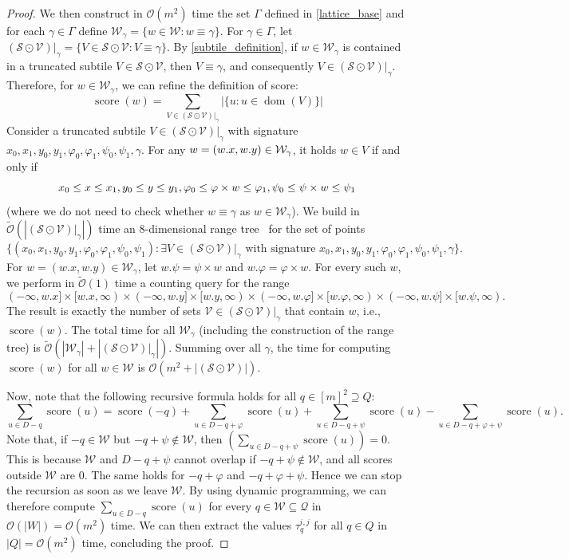 \documentclass[a4paper,11pt]{article}
\let\Cref\cref
\renewcommand{\O}{\mathcal{O}}
\newcommand{\tO}{\tilde{\mathcal{O}}}
\newcommand{\Q}{\mathcal{Q}}
\renewcommand{\S}{\mathcal{S}}
\newcommand{\V}{\mathcal{V}}
\newcommand{\W}{\mathcal{W}}
\renewcommand{\phi}{\varphi}
\DeclareMathOperator*{\score}{score}
\DeclareMathOperator*{\dom}{dom}
\newcommand{\absolute}[1]{\left\lvert#1\right\rvert}
\begin{document}
\begin{proof}
We then construct in $\O(m^2)$ time the set $\Gamma$ defined in \Cref{lattice_base} and for each $\gamma \in \Gamma$ define $\W_\gamma = \{w \in \W : w \equiv \gamma\}$. For $\gamma \in \Gamma$, let $(\S \odot \V) |_\gamma = \{V \in \S \odot \V : V \equiv \gamma\}$. 
By \cref{subtile_definition}, if $w \in \W_\gamma$ is contained in a truncated subtile $V \in \S \odot \V$, then $V \equiv \gamma$, and consequently $V \in (\S \odot \V) |_\gamma$. Therefore, for $w \in \W_\gamma$, we can refine the definition of score:
%
$$\score(w) = \sum_{V \in (\S \odot \V) |_\gamma} \absolute{\{u : u \in \dom(V)\}}$$
%
Consider a truncated subtile $V \in (\S \odot \V) |_\gamma$ with signature $x_0, x_1, y_0, y_1, \phi_0, \phi_1, \psi_0, \psi_1, \gamma$. For any $w = (\x{w}, \y{w}) \in \W_\gamma$, it holds $w \in V$ if and only if
\begin{equation}
\label{eq:range}
x_0 \le x \le x_1, y_0 \le y \le y_1, \phi_0 \le \h{w} \le \phi_1, \psi_0 \le \s{w} \le \psi_1
\end{equation}
(where we do not need to check whether $w \equiv \gamma$ as $w \in \W_\gamma$). We build in $\tO(\absolute{(\S \odot \V) |_\gamma})$ time an $8$-dimensional range tree~\cite{BENTLEY1979244} for the set of points 
%
$$\{(x_0, x_1, y_0, y_1, \phi_0, \phi_1, \psi_0, \psi_1) : \exists V \in (\S \odot \V) |_\gamma\text{\ with signature\ } x_0, x_1, y_0, y_1, \phi_0, \phi_1, \psi_0, \psi_1, \gamma\}.$$
For $w = (w.x, w.y) \in \W_\gamma$, let $w.\psi = \psi \times w$ and $w.\phi = \phi \times w$. For every such $w$, we perform in $\tO(1)$ time a counting query for the range 
$$
(-\infty, w.x] \times [w.x, \infty) \times 
(-\infty, w.y] \times [w.y, \infty) \times
(-\infty, w.\phi] \times [w.\phi, \infty) \times
(-\infty, w.\psi] \times [w.\psi, \infty).
$$
The result is exactly the number of sets $\V \in (\S \odot \V) |_\gamma$ that contain $w$, i.e., $\score(w)$. The total time for all $\W_\gamma$ (including the construction of the range tree) is $\tO(\absolute{\W_\gamma} + \absolute{(\S \odot \V) |_\gamma})$. Summing over all $\gamma$, the time for computing $\score(w)$ for all $w \in \W$ is $\O(m^2 + \absolute{(\S \odot \V)})$.

Now, note that the following recursive formula holds for all $q \in [m]^2 \supseteq Q$:
%
$$\sum_{u \in D-q} \score(u) = \score(-q) + \sum_{u \in D-q+\phi} \score(u) + \sum_{u \in D-q+\psi} \score(u) -\sum_{u \in D-q+\phi+\psi} \score(u).$$
%
Note that, if $-q \in \W$ but $-q + \psi \notin \W$, then $(\sum_{u \in D-q+\psi} \score(u)) = 0$. This is because $\W$ and $D -q + \psi$ cannot overlap if $-q + \psi \notin \W$, and all scores outside $\W$ are $0$. The same holds for $-q + \phi$ and $-q + \phi + \psi$. Hence we can stop the recursion as soon as we leave $\W$. By using dynamic programming, we can therefore compute $\sum_{u \in D-q} \score(u)$ for every $q \in\W \subseteq \Q$ in $\O(\absolute{W}) = \O(m^2)$ time. 
We can then extract the values $\tau^{i,j}_q$ for all $q \in Q$ in $\absolute{Q} = \O(m^2)$ time, concluding the proof. 
\end{proof}
	
\end{document}
